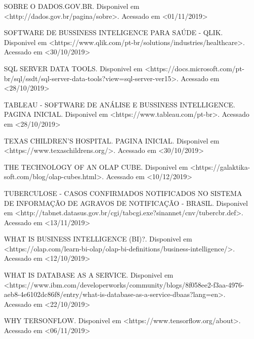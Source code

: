\documentclass[
	12pt,				%
	openright,			%
	oneside,			%
	a4paper,			%
	chapter=TITLE,		%
	section=TITLE,		%
	subsection=TITLE,	%
	subsubsection=TITLE,%
	english,			%
	brazil				%
	]{abntex2}
\theoremstyle{definition}
\begin{document}
SOBRE O DADOS.GOV.BR. Disponivel em <http://dados.gov.br/pagina/sobre>. Acessado em <01/11/2019>

SOFTWARE DE BUSSINESS INTELIGENCE PARA SAÚDE - QLIK. Disponivel em <https://www.qlik.com/pt-br/solutions/industries/healthcare>. Acessado em <30/10/2019>

SQL SERVER DATA TOOLS. Disponivel em <https://docs.microsoft.com/pt-br/sql/ssdt/sql-server-data-tools?view=sql-server-ver15>. Acessado em <28/10/2019>

TABLEAU - SOFTWARE DE ANÁLISE E BUSSINESS INTELLIGENCE. PAGINA INICIAL. Disponivel em <https://www.tableau.com/pt-br>. Acessado em <28/10/2019>

TEXAS CHILDREN'S HOSPITAL. PAGINA INICIAL. Disponivel em <https://www.texaschildrens.org/>. Acessado em <30/10/2019>

THE TECHNOLOGY OF AN OLAP CUBE. Disponivel em <https://galaktika-soft.com/blog/olap-cubes.html>. Acessado em <10/12/2019>

TUBERCULOSE - CASOS CONFIRMADOS NOTIFICADOS NO SISTEMA DE INFORMAÇÃO DE AGRAVOS DE NOTIFICAÇÃO - BRASIL. Disponivel em <http://tabnet.datasus.gov.br/cgi/tabcgi.exe?sinannet/cnv/tubercbr.def>. Acessado em <13/11/2019>

WHAT IS BUSINESS INTELLIGENCE (BI)?. Disponivel em <https://olap.com/learn-bi-olap/olap-bi-definitions/business-intelligence/>. Acessado em <12/10/2019>

WHAT IS DATABASE AS A SERVICE. Disponivel em <https://www.ibm.com/developerworks/community/blogs/8f058ee2-f3aa-4976-aeb8-4e6102dc86f8/entry/what-is-database-as-a-service-dbaas?lang=en>. Acessado em <22/10/2019>

WHY TERSONFLOW. Disponivel em <https://www.tensorflow.org/about>. Acessado em <06/11/2019>

\end{document}
